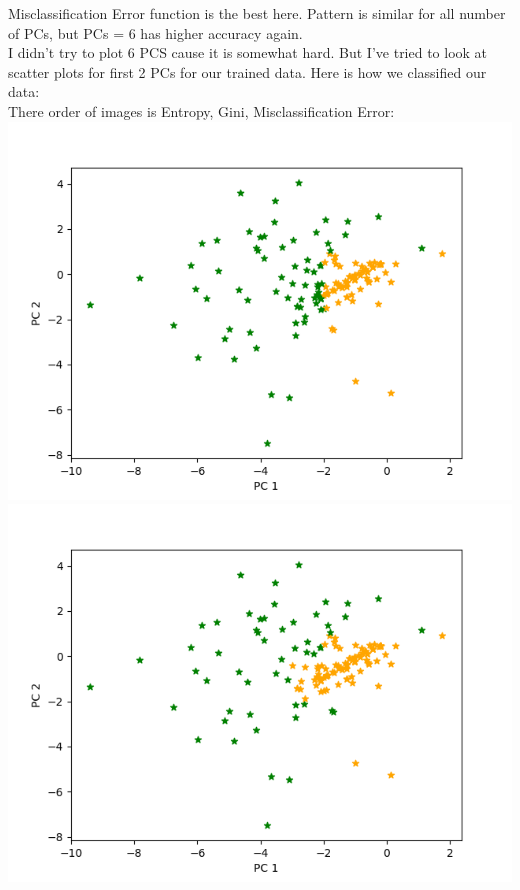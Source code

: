 \documentclass[12pt, letterpaper]{article}
\begin{document}
\begin{enumerate}[label=\Roman*.]
\begin{enumerate}[label=\arabic*.]
		Misclassification Error function is the best here. Pattern is similar for all number of PCs, but PCs = 6 has higher accuracy again. \\
		
		I didn't try to plot 6 PCS cause it is somewhat hard. But I've tried to look at scatter plots for first 2 PCs for our trained data. Here is how we classified our data: \\
		
		There order of images is Entropy, Gini, Misclassification Error: \\
		\includegraphics[scale=0.5]{../images/clusters_entropy_Depth_.png} 
		\includegraphics[scale=0.5]{../images/clusters_gini_Depth_.png} 

\end{enumerate}
\end{enumerate}
\end{document}
